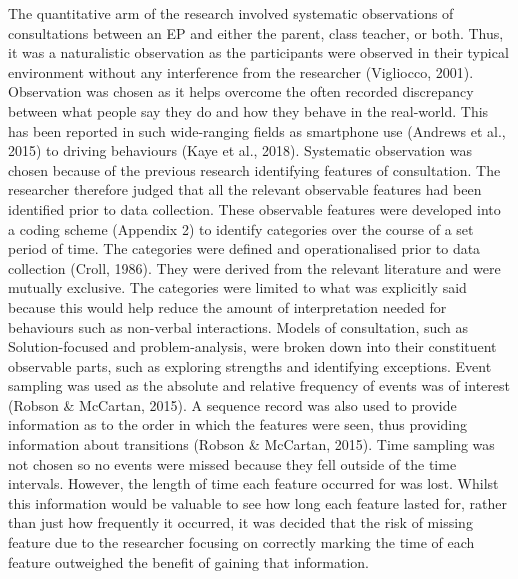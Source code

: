 \documentclass[
  english,
  man]{apa}
\begin{document}
The quantitative arm of the research involved systematic observations of consultations between an EP and either the parent, class teacher, or both. Thus, it was a naturalistic observation as the participants were observed in their typical environment without any interference from the researcher (Vigliocco, 2001). Observation was chosen as it helps overcome the often recorded discrepancy between what people say they do and how they behave in the real-world. This has been reported in such wide-ranging fields as smartphone use (Andrews et al., 2015) to driving behaviours (Kaye et al., 2018). Systematic observation was chosen because of the previous research identifying features of consultation. The researcher therefore judged that all the relevant observable features had been identified prior to data collection. These observable features were developed into a coding scheme (Appendix 2) to identify categories over the course of a set period of time. The categories were defined and operationalised prior to data collection (Croll, 1986). They were derived from the relevant literature and were mutually exclusive. The categories were limited to what was explicitly said because this would help reduce the amount of interpretation needed for behaviours such as non-verbal interactions. Models of consultation, such as Solution-focused and problem-analysis, were broken down into their constituent observable parts, such as exploring strengths and identifying exceptions. Event sampling was used as the absolute and relative frequency of events was of interest (Robson \& McCartan, 2015). A sequence record was also used to provide information as to the order in which the features were seen, thus providing information about transitions (Robson \& McCartan, 2015). Time sampling was not chosen so no events were missed because they fell outside of the time intervals. However, the length of time each feature occurred for was lost. Whilst this information would be valuable to see how long each feature lasted for, rather than just how frequently it occurred, it was decided that the risk of missing feature due to the researcher focusing on correctly marking the time of each feature outweighed the benefit of gaining that information.
\end{document}
